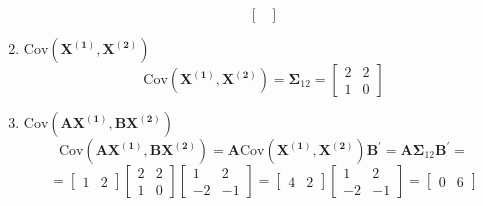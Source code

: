 \begin{enumerate}[label=(\alph*)]
\[\begin{bmatrix}
                \end{bmatrix}
            \]
            \item $\text{Cov}\left(\mathbf{X^{(1)}}, \mathbf{X^{(2)}}\right)$
            \[
                \text{Cov}\left(\mathbf{X^{(1)}}, \mathbf{X^{(2)}}\right)
                =
                \mathbf{\Sigma}_{12}
                =
                \begin{bmatrix}
                    2 & 2 \\
                    1 & 0
                \end{bmatrix}
            \]
            \item $\text{Cov}\left(\mathbf{A}\mathbf{X^{(1)}}, \mathbf{B}\mathbf{X^{(2)}}\right)$
            \[
                \text{Cov}\left(\mathbf{A}\mathbf{X^{(1)}}, \mathbf{B}\mathbf{X^{(2)}}\right)
                =
                \mathbf{A}\text{Cov}\left(\mathbf{X^{(1)}}, \mathbf{X^{(2)}}\right)\mathbf{B}^\prime
                =
                \mathbf{A}\mathbf{\Sigma}_{12}\mathbf{B}^\prime
                =
            \]
            \[
                =
                \begin{bmatrix}
                    1 & 2
                \end{bmatrix}
                \begin{bmatrix}
                    2 & 2 \\
                    1 & 0
                \end{bmatrix}
                \begin{bmatrix}
                    1 & 2 \\
                    -2 & -1
                \end{bmatrix}
                =
                \begin{bmatrix}
                    4 & 2
                \end{bmatrix}
                \begin{bmatrix}
                    1 & 2 \\
                    -2 & -1
                \end{bmatrix}
                =
                \begin{bmatrix}
                    0 & 6
                \end{bmatrix}
            \]
        \end{enumerate}